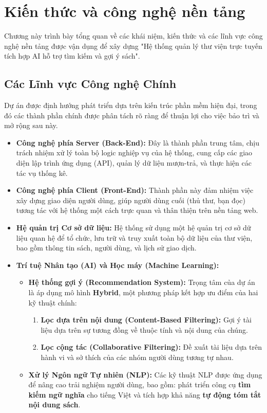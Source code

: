 \newpage
\chapter{Kiến thức và công nghệ nền tảng}

Chương này trình bày tổng quan về các khái niệm, kiến thức và các lĩnh vực công nghệ nền tảng được vận dụng để xây dựng "Hệ thống quản lý thư viện trực tuyến tích hợp AI hỗ trợ tìm kiếm và gợi ý sách".

\section{Các Lĩnh vực Công nghệ Chính}

Dự án được định hướng phát triển dựa trên kiến trúc phần mềm hiện đại, trong đó các thành phần chính được phân tách rõ ràng để thuận lợi cho việc bảo trì và mở rộng sau này.

\begin{itemize}
    \item \textbf{Công nghệ phía Server (Back-End):} Đây là thành phần trung tâm, chịu trách nhiệm xử lý toàn bộ logic nghiệp vụ của hệ thống, cung cấp các giao diện lập trình ứng dụng (API), quản lý dữ liệu mượn-trả, và thực hiện các tác vụ thống kê.
    
    \item \textbf{Công nghệ phía Client (Front-End):} Thành phần này đảm nhiệm việc xây dựng giao diện người dùng, giúp người dùng cuối (thủ thư, bạn đọc) tương tác với hệ thống một cách trực quan và thân thiện trên nền tảng web.
    
    \item \textbf{Hệ quản trị Cơ sở dữ liệu:} Hệ thống sử dụng một hệ quản trị cơ sở dữ liệu quan hệ để tổ chức, lưu trữ và truy xuất toàn bộ dữ liệu của thư viện, bao gồm thông tin sách, người dùng, và lịch sử giao dịch.
    
    \item \textbf{Trí tuệ Nhân tạo (AI) và Học máy (Machine Learning):}
    \begin{itemize}
        \item \textbf{Hệ thống gợi ý (Recommendation System):} Trọng tâm của dự án là áp dụng mô hình \textbf{Hybrid}, một phương pháp kết hợp ưu điểm của hai kỹ thuật chính:
        \begin{enumerate}
            \item \textbf{Lọc dựa trên nội dung (Content-Based Filtering):} Gợi ý tài liệu dựa trên sự tương đồng về thuộc tính và nội dung của chúng.
            \item \textbf{Lọc cộng tác (Collaborative Filtering):} Đề xuất tài liệu dựa trên hành vi và sở thích của các nhóm người dùng tương tự nhau.
        \end{enumerate}
        
        \item \textbf{Xử lý Ngôn ngữ Tự nhiên (NLP):} Các kỹ thuật NLP được ứng dụng để nâng cao trải nghiệm người dùng, bao gồm: phát triển công cụ \textbf{tìm kiếm ngữ nghĩa} cho tiếng Việt và tích hợp khả năng \textbf{tự động tóm tắt nội dung sách}.
    \end{itemize}
\end{itemize}

